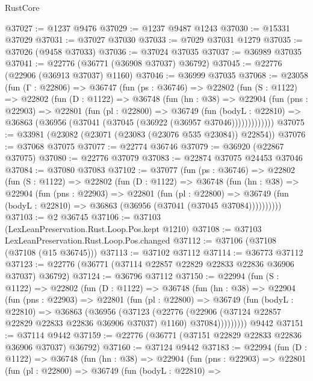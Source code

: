 \begin{lexlean}{RustCore}
\begin{coremodule}
@37027 := @1237 @9476
@37029 := @1237 @9487 @1243
@37030 := @15331 @37029
@37031 := @37027 @37030
@37033 := @7029 @37031 @1279
@37035 := @37026 (@9458 @37033)
@37036 := @37024 @37035
@37037 := @36989 @37035
@37041 := @22776 (@36771 (@36908 @37037) @36792)
@37045 := @22776 (@22906 (@36913 @37037) @1160)
@37046 := @36999 @37035
@37068 := @23058
    (fun (Γ : @22806) =>
    @36747
      (fun (ps : @36746) =>
      @22802
        (fun (S : @1122) =>
        @22802
          (fun (D : @1122) =>
          @36748
            (fun (hn : @38) =>
            @22904
              (fun (pns : @22903) =>
              @22801
                (fun (pl : @22800) =>
                @36749
                  (fun (bodyL : @22810) =>
                  @36863 (@36956 (@37041 (@37045 (@36922 (@36957 @37046)))))))))))))
@37075 := @33981 (@23082 (@23071 (@23083 (@23076 @535 @23084)) @22854))
@37076 := @37068 @37075
@37077 := @22774 @36746
@37079 := @36920 (@22867 @37075)
@37080 := @22776 @37079
@37083 := @22874 @37075 @24453 @37046
@37084 := @37080 @37083
@37102 := @37077
    (fun (ps : @36746) =>
    @22802
      (fun (S : @1122) =>
      @22802
        (fun (D : @1122) =>
        @36748
          (fun (hn : @38) =>
          @22904
            (fun (pns : @22903) =>
            @22801
              (fun (pl : @22800) =>
              @36749 (fun (bodyL : @22810) => @36863 (@36956 (@37041 (@37045 @37084))))))))))
@37103 := @2 @36745
@37106 := @37103 (LexLeanPreservation.Rust.Loop.Pos.kept @1210)
@37108 := @37103 LexLeanPreservation.Rust.Loop.Pos.changed
@37112 := @37106 (@37108 (@37108 (@15 @36745)))
@37113 := @37102 @37112
@37114 := @36773 @37112
@37123 := @22776 (@36771 (@37114 @22857 @22829 @22833 @22836 @36906 @37037) @36792)
@37124 := @36796 @37112
@37150 := @22994
    (fun (S : @1122) =>
    @22802
      (fun (D : @1122) =>
      @36748
        (fun (hn : @38) =>
        @22904
          (fun (pns : @22903) =>
          @22801
            (fun (pl : @22800) =>
            @36749
              (fun (bodyL : @22810) =>
              @36863
                (@36956
                  (@37123
                    (@22776
                      (@22906 (@37124 @22857 @22829 @22833 @22836 @36906 @37037) @1160)
                      @37084)))))))))
    @9442
@37151 := @37114 @9442
@37159 := @22776 (@36771 (@37151 @22829 @22833 @22836 @36906 @37037) @36792)
@37160 := @37124 @9442
@37183 := @22994
    (fun (D : @1122) =>
    @36748
      (fun (hn : @38) =>
      @22904
        (fun (pns : @22903) =>
        @22801
          (fun (pl : @22800) =>
          @36749
            (fun (bodyL : @22810) =>

\end{coremodule}
\end{lexlean}

